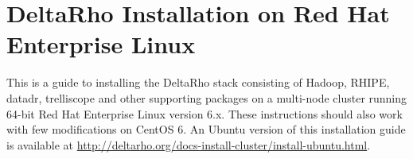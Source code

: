 \section{DeltaRho Installation on Red Hat Enterprise Linux}

This is a guide to installing the DeltaRho stack consisting of
Hadoop, RHIPE, datadr, trelliscope and other
supporting packages on a multi-node cluster running 64-bit Red Hat
Enterprise Linux version 6.x.  These instructions should
also work with few modifications on CentOS 6.  An Ubuntu
version of this installation guide is available at
\url{http://deltarho.org/docs-install-cluster/install-ubuntu.html}.
